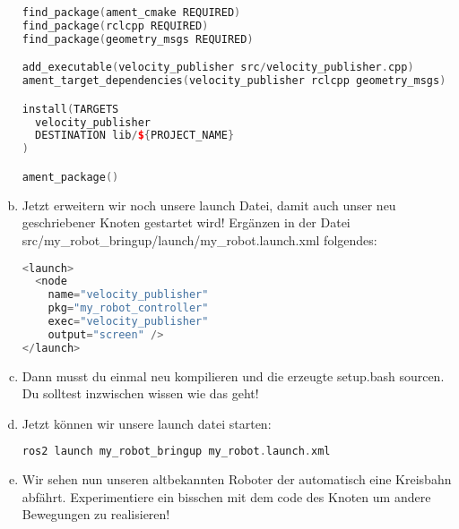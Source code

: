 \documentclass[a4paper,12pt]{article}
\begin{document}
\begin{enumerate}[a)]
{\begin{lstlisting}[language=C++,basicstyle=\fontsize{6.5}{8}\selectfont]
find_package(ament_cmake REQUIRED)
find_package(rclcpp REQUIRED)
find_package(geometry_msgs REQUIRED)

add_executable(velocity_publisher src/velocity_publisher.cpp)
ament_target_dependencies(velocity_publisher rclcpp geometry_msgs)

install(TARGETS
  velocity_publisher
  DESTINATION lib/${PROJECT_NAME}
)

ament_package()
\end{lstlisting}
}
\item{
Jetzt erweitern wir noch unsere launch Datei, damit auch unser neu geschriebener Knoten gestartet wird! Ergänzen in der Datei src/my\_robot\_bringup/launch/my\_robot.launch.xml folgendes:
\begin{lstlisting}[language=C++,basicstyle=\fontsize{6.5}{8}\selectfont]
<launch>
  <node
    name="velocity_publisher"
    pkg="my_robot_controller"
    exec="velocity_publisher"
    output="screen" />
</launch>
\end{lstlisting}
}
\item{Dann musst du einmal neu kompilieren und die erzeugte setup.bash sourcen. Du solltest inzwischen wissen wie das geht!}
\item{Jetzt können wir unsere launch datei starten:
\begin{lstlisting}[language=C++,basicstyle=\fontsize{6.5}{8}\selectfont]
ros2 launch my_robot_bringup my_robot.launch.xml
\end{lstlisting}
}
\item{Wir sehen nun unseren altbekannten Roboter der automatisch eine Kreisbahn abfährt. Experimentiere ein bisschen mit dem code des Knoten um andere Bewegungen zu realisieren!}
\end{enumerate}
\end{document}

